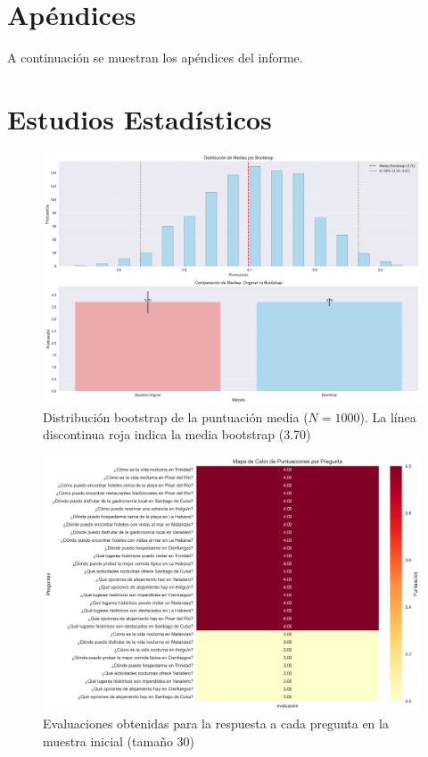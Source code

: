 \documentclass[10pt]{llncs}
\begin{document}
\newpage
\section{Apéndices}
A continuación se muestran los apéndices del informe.
\appendix

\section{Estudios Estadísticos}

\begin{figure}
\centering
\includegraphics[width=1\textwidth]{../src/experiments/one_only_agent/bootstrap_distribution_20250617-171514.png}
\caption{Distribución bootstrap de la puntuación media ($N=1000$). La línea discontinua roja indica la media bootstrap (3.70)}
\label{fig:boot_dist_1}
\end{figure}

\begin{figure}
\centering
\includegraphics[width=1\textwidth]{../src/experiments/one_only_agent/quality_heatmap_20250617-171514.png}
\caption{Evaluaciones obtenidas para la respuesta a cada pregunta en la muestra inicial (tamaño 30)}
\label{fig:eval_1}
\end{figure}
\end{document}
